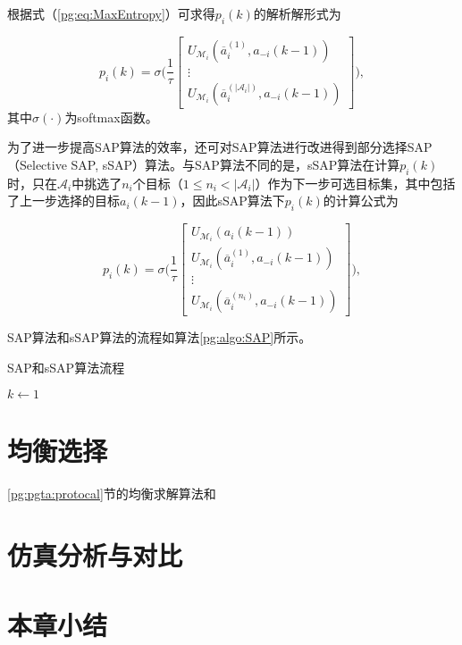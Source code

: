 根据式（\ref{pg:eq:MaxEntropy}）可求得$p_i(k)$的解析解形式为

\begin{equation}
\label{pg:eq:sappdf}
	p_i(k) = \sigma \Bigg(\frac{1}{\tau}\begin{bmatrix}
		U_{\mathcal{M}_i}(\overline a_i^{(1)},a_{-i}(k-1))\\ \vdots \\ U_{\mathcal{M}_i}(\overline a_i^{(|\mathcal{A}_i|)},a_{-i}(k-1))
	\end{bmatrix} \Bigg),
\end{equation}
其中$\sigma(\cdot)$为softmax函数。

为了进一步提高SAP算法的效率，还可对SAP算法进行改进得到部分选择SAP（Selective SAP, sSAP）算法。与SAP算法不同的是，sSAP算法在计算$p_i(k)$时，只在$\mathcal{A}_i$中挑选了$n_i$个目标（$1 \leq n_i < |\mathcal{A}_i|$）作为下一步可选目标集，其中包括了上一步选择的目标$a_i(k-1)$，因此sSAP算法下$p_i(k)$的计算公式为

\begin{equation}
\label{pg:eq:ssappdf}
	p_i(k) = \sigma \Bigg(\frac{1}{\tau}\begin{bmatrix}
		U_{\mathcal{M}_i}(a_i(k-1))\\ U_{\mathcal{M}_i}(\overline a_i^{(1)},a_{-i}(k-1))\\
	\vdots \\ U_{\mathcal{M}_i}(\overline a_i^{(n_i)},a_{-i}(k-1))
	\end{bmatrix} \Bigg),
\end{equation}

SAP算法和sSAP算法的流程如算法\ref{pg:algo:SAP}所示。

\begin{algorithm}[htb]
	\caption{SAP和sSAP算法流程}
	\label{pg:algo:SAP}
	\small
	\SetAlgoLined
	
	$k \gets 1$\;
\end{algorithm}

\section{均衡选择}
\label{pg:selection}
\ref{pg:pgta:protocal}节的均衡求解算法和

\section{仿真分析与对比}
\label{pg:simulation}



\section{本章小结}
\label{pg:conclusion}

















